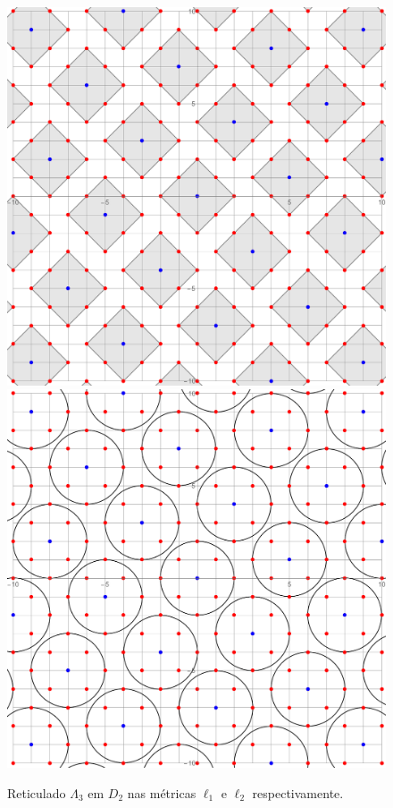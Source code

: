 \documentclass{article}
\theoremstyle{plain}
\theoremstyle{definition}
\theoremstyle{remark}
\begin{document}
  \begin{figure}[!ht]
    \centering
        \includegraphics[scale=0.2]{newcoder2l1.pdf}\;\;\;\;\includegraphics[scale=0.2]{newcoder2l2.pdf}
        \caption{Reticulado $\Lambda_3$ em $D_2$ nas métricas $\ell_1$ e $\ell_2$ respectivamente.}
  \end{figure}
\end{document}
